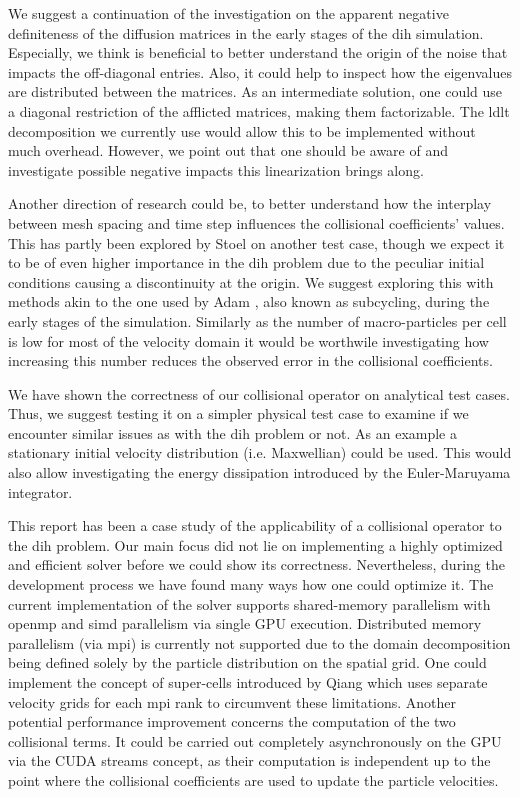 We suggest a continuation of the investigation on the apparent negative definiteness of the
diffusion matrices in the early stages of the \gls{dih} simulation. Especially, we think is beneficial to
better understand the origin of the noise that impacts the off-diagonal entries. Also, it could help
to inspect how the eigenvalues are distributed between the matrices.
As an intermediate solution, one could use a diagonal restriction of the afflicted matrices, making them
factorizable. The \gls{ldlt} decomposition we currently use would allow this to be implemented without
much overhead. However, we point out that one should be aware of and investigate possible negative
impacts this linearization brings along.

Another direction of research could be, to better understand how the interplay between mesh
spacing and time step influences the collisional coefficients' values. This has partly been explored
by Stoel \cite{stoel} on another test case, though we expect it to be of even higher importance in
the \gls{dih} problem due to the peculiar initial conditions causing a discontinuity at the origin.
We suggest exploring this with methods akin to the one used by Adam
\cite{subcyclingAdam1982}, also known as subcycling, during the early stages of the simulation.
Similarly as the number of macro-particles per cell is low for most of the velocity domain it would be
worthwile investigating how increasing this number reduces the observed error in the collisional
coefficients.

We have shown the correctness of our collisional operator on analytical test cases.
Thus, we suggest testing it on a simpler physical test case to examine if we
encounter similar issues as with the \gls{dih} problem or not.
As an example a stationary initial velocity distribution (i.e. Maxwellian) could be used.
This would also allow investigating the energy dissipation introduced by the Euler-Maruyama integrator.

This report has been a case study of the applicability of a collisional operator to the \gls{dih} problem.
Our main focus did not lie on implementing a highly optimized and efficient solver before we could
show its correctness. Nevertheless, during the development process we have found many ways how one
could optimize it.
The current implementation of the solver supports shared-memory parallelism with \gls{openmp} and
\gls{simd} parallelism via single GPU execution.
Distributed memory parallelism (via \gls{mpi}) is currently not supported due to the domain
decomposition being defined solely by the particle distribution on the spatial grid.
One could implement the concept of super-cells introduced by Qiang \cite{qiang2000self} which uses
separate velocity grids for each \gls{mpi} rank to circumvent these limitations.
Another potential performance improvement concerns the computation of the two collisional terms.
It could be carried out completely asynchronously on the GPU via the CUDA streams concept,
as their computation is independent up to the point where the collisional coefficients are used
to update the particle velocities.
